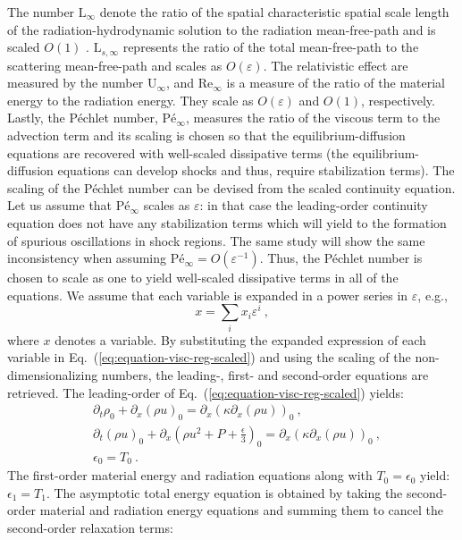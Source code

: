 \documentclass[review]{elsarticle}
\newcommand{\eqt}[1]{Eq.~(\ref{#1})}                     %
\renewcommand{\Re}{\textrm{Re}}
\newcommand{\Us}{\textrm{U}}
\newcommand{\Ls}{\textrm{L}}
\newcommand{\Pe}{\textrm{P\'e}}
\begin{document}
The number $\Ls_\infty$ denote the ratio of the spatial characteristic spatial scale length of the radiation-hydrodynamic solution to the radiation mean-free-path and is scaled $O(1)$ . $\Ls_{s,\infty}$ represents the ratio of the total mean-free-path to the scattering mean-free-path and scales as $O(\varepsilon)$. The relativistic effect are measured by the number $\Us_\infty$, and $\Re_\infty$ is a measure of the ratio of the material energy to the radiation energy. They scale as $O(\varepsilon)$ and $O(1)$, respectively. Lastly, the P\' echlet number, $\Pe_\infty$, measures the ratio of the viscous term to the advection term and its scaling is chosen so that the equilibrium-diffusion equations are recovered with well-scaled dissipative terms (the equilibrium-diffusion equations can develop shocks and thus, require stabilization terms). The scaling of the P\'echlet number can be devised from the scaled continuity equation. Let us assume that $\Pe_\infty$ scales as $\varepsilon$: in that case the leading-order continuity equation does not have any stabilization terms which will yield to the formation of spurious oscillations in shock regions. The same study will show the same inconsistency when assuming $\Pe_\infty = O(\varepsilon^{-1})$. Thus, the P\'echlet number is chosen to scale as one to yield well-scaled dissipative terms in all of the equations. We assume that each variable is expanded in a power series in $\varepsilon$, e.g.,
%
\begin{equation}\label{eq:expansion-series}
x = \sum_i x_i \varepsilon^i \ ,
\end{equation}
%
where $x$ denotes a variable. By substituting the expanded expression of each variable in \eqt{eq:equation-visc-reg-scaled} and using the scaling of the non-dimensionalizing numbers, the leading-, first- and second-order equations are retrieved. The leading-order of \eqt{eq:equation-visc-reg-scaled} yields:
%
\begin{align}\label{eq:first-order}
&\partial_t \rho_0 + \partial_x \left( \rho u \right)_0 = \partial_x \left( \kappa \partial_x \left( \rho u \right)\right)_0 \nonumber \ ,\\
&\partial_t \left( \rho u \right)_0 + \partial_x \left( \rho u^2 + P + \frac{\epsilon}{3}\right)_0 = \partial_x \left( \kappa \partial_x \left( \rho u \right) \right)_0  \ , \\
&\epsilon_0 = T_0 \nonumber \ .
\end{align}
%
The first-order material energy and radiation equations along with $T_0 = \epsilon_0$ yield: $\epsilon_1 = T_1$. The asymptotic total energy equation is obtained by taking the second-order material and radiation energy equations and summing them to cancel the second-order relaxation terms:
\end{document}
